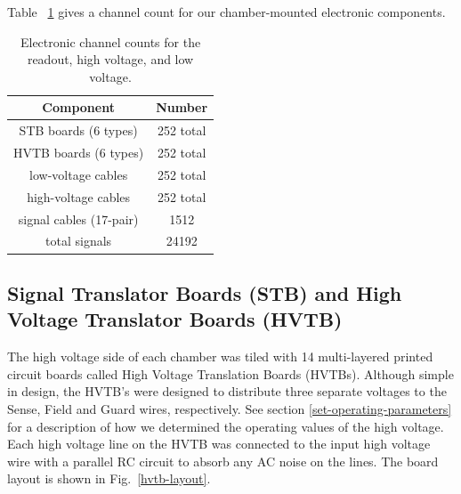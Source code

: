 Table ~\ref{electronic-components} gives a channel count for our chamber-mounted electronic components.
\begin{table}[htbp]
\begin{center}
\begin{tabular} {||c|c||} \hline \hline
{\bf Component}           & {\bf Number} \\ \hline
STB boards (6 types)      & 252 total \\ \hline
HVTB boards (6 types)     & 252 total \\ \hline
low-voltage cables        & 252 total  \\ \hline
high-voltage cables       & 252 total  \\ \hline
signal cables (17-pair)   & 1512 \\ \hline
total signals             & 24192 \\ \hline \hline
\end{tabular}
\caption{\small{Electronic channel counts for the readout, high voltage,
and low voltage.}}
\label{electronic-components}
\end{center}
\end{table}

\subsection{Signal Translator Boards (STB) and High Voltage Translator Boards (HVTB)}

The high voltage side of each chamber was tiled with 14  multi-layered printed circuit 
boards called High Voltage Translation Boards (HVTBs).  Although simple in design,
the HVTB's were designed to distribute three separate voltages to the Sense, Field
and Guard wires, respectively.  See section \ref{set-operating-parameters} for a 
description of how we determined the operating values of the high voltage.  
Each high voltage line on the HVTB was connected to the 
input high voltage wire with a parallel RC circuit to absorb any AC noise on
the lines.  The board layout is shown in Fig.~\ref{hvtb-layout}.

